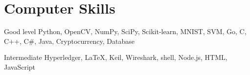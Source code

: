 \documentclass{tccv}
\begin{document}
\section{Computer Skills}
\begin{factlist}

\item{Good level}
     {Python, OpenCV, NumPy, SciPy, Scikit-learn, MNIST, SVM, Go, C, C++, C\#, Java, Cryptocurrency, Database}


\item{Intermediate}
     {Hyperledger, \LaTeX, Keil, Wireshark, shell, Node.js, HTML, JavaScript}


\end{factlist}

\end{document}
